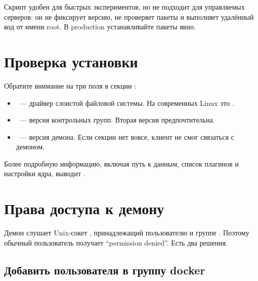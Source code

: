 \begin{warnbox}
Скрипт  удобен для быстрых
экспериментов, но не подходит для управляемых серверов: он не фиксирует
версию, не проверяет пакеты и выполняет удалённый код от имени root.
В production устанавливайте пакеты явно.
\end{warnbox}

\section{Проверка установки}


Обратите внимание на три поля в секции :

\begin{itemize}
  \item {}~--- драйвер слоистой файловой системы.
        На современных Linux это .
  \item {}~--- версия контрольных групп. Вторая версия
        предпочтительна.
  \item {}~--- версия демона. Если секции 
        нет вовсе, клиент не смог связаться с демоном.
\end{itemize}

Более подробную информацию, включая путь к данным, список плагинов
и настройки ядра, выводит .

\section{Права доступа к демону}

Демон слушает Unix-сокет , принадлежащий
пользователю  и группе . Поэтому обычный
пользователь получает \enquote{permission denied}. Есть два решения.

\subsection{Добавить пользователя в группу docker}

